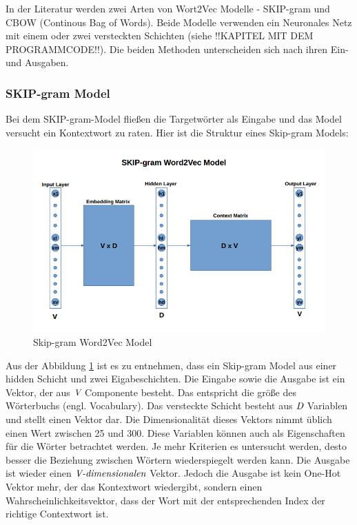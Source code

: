 In der Literatur werden zwei Arten von Wort2Vec Modelle - SKIP-gram und CBOW (Continous Bag of Words). Beide Modelle verwenden ein Neuronales Netz mit einem oder zwei versteckten Schichten (siehe !!KAPITEL MIT DEM PROGRAMMCODE!!). Die beiden Methoden unterscheiden sich nach ihren Ein- und Ausgaben.   

\subsubsection{SKIP-gram Model}
Bei dem SKIP-gram-Model fließen die Targetwörter als Eingabe und das Model versucht ein Kontextwort zu raten. Hier ist die Struktur eines Skip-gram Models:

\begin{figure}
	\centering
	\includegraphics[scale=0.5]{images/SKIP_Model.png}
	\caption{Skip-gram Word2Vec Model}
	\label{skip}
\end{figure}

Aus der Abbildung \ref{skip} ist es zu entnehmen, dass ein Skip-gram Model aus einer hidden Schicht und zwei Eigabeschichten. Die Eingabe sowie die Ausgabe ist ein Vektor, der aus $\emph{V}$ Componente besteht. Das entspricht die größe des Wörterbuchs (engl. Vocabulary). Das versteckte Schicht besteht aus $\emph{D}$ Variablen und stellt einen Vektor dar. Die Dimensionalität dieses Vektors nimmt üblich einen Wert zwischen 25 und 300. Diese Variablen können auch als Eigenschaften für die Wörter betrachtet werden. Je mehr Kriterien es untersucht werden, desto besser die Beziehung zwischen Wörtern wiederspiegelt werden kann. Die Ausgabe ist wieder einen $\emph{V-dimensionalen}$ Vektor. Jedoch die Ausgabe ist kein One-Hot Vektor mehr, der das Kontextwort wiedergibt, sondern einen Wahrscheinlichkeitsvektor, dass der Wort mit der entsprechenden Index der richtige Contextwort ist.

